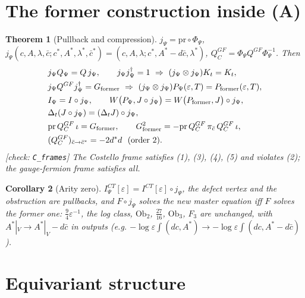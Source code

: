 \documentclass[11pt]{article}
\theoremstyle{plain}
\newtheorem{theorem}{Theorem}[section]
\newtheorem{corollary}[theorem]{Corollary}
\theoremstyle{definition}
\numberwithin{equation}{section}
\begin{document}
\section{The former construction inside (A)}

\begin{theorem}[Pullback and compression]
\label{thm:pull}
$j_\Psi=\mathrm{pr}\circ\Phi_\Psi$, $j_\Psi(c,A,\lambda,\bar c;c^*,A^*,\lambda^*,\bar c^*)=(c,A,\lambda;c^*,A^*-d\bar c,\lambda^*)$, $Q^{GF}_C=\Phi_\Psi Q^{GF}\Phi_\Psi^{-1}$. Then
\[
\begin{aligned}
&j_\Psi Q_\Psi=Q\,j_\Psi,\qquad j_\Psi j_\Psi^\dagger=1\ \Rightarrow\ (j_\Psi\otimes j_\Psi)K_t=K_t,\\
&j_\Psi Q^{GF}j_\Psi^\dagger=G_{\rm former}\ \Rightarrow\ (j_\Psi\otimes j_\Psi)P_\Psi(\varepsilon,T)=P_{\rm former}(\varepsilon,T),\\
&I_\Psi=I\circ j_\Psi,\qquad W\big(P_\Psi,J\circ j_\Psi\big)=W\big(P_{\rm former},J\big)\circ j_\Psi,\\
&\Delta_t(J\circ j_\Psi)=(\Delta_tJ)\circ j_\Psi,\\
&\mathrm{pr}\,Q^{GF}_C\,\iota=G_{\rm former},\qquad G_{\rm former}^2=-\mathrm{pr}\,Q^{GF}_C\,\pi_{\bar c}\,Q^{GF}_C\,\iota,\\
&(Q^{GF}_C)_{\bar c\to\bar c^*}=-2d^*d\ \ (\text{order }2).
\end{aligned}
\]
[check: \texttt{C\_frames}] The Costello frame satisfies (1), (3), (4), (5) and violates (2); the gauge-fermion frame satisfies all.
\end{theorem}

\begin{corollary}[Arity zero]
$I^{CT}_\Psi[\varepsilon]=I^{CT}[\varepsilon]\circ j_\Psi$, the defect vertex and the obstruction are pullbacks, and $F\circ j_\Psi$ solves the new master equation iff $F$ solves the former one: $\tfrac94\varepsilon^{-1}$, the log class, $\mathrm{Ob}_2$, $\tfrac{27}{16}$, $\mathrm{Ob}_3$, $F_3$ are unchanged, with $A^*|_V\to A^*|_V-d\bar c$ in outputs (e.g. $-\log\varepsilon\int(dc,A^*)\to-\log\varepsilon\int(dc,A^*-d\bar c)$).
\end{corollary}

\section{Equivariant structure}
\end{document}
